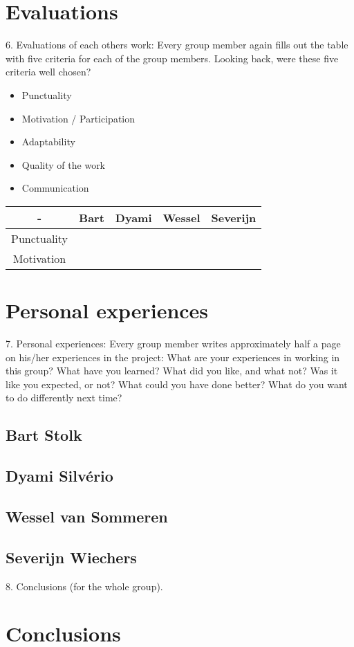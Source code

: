\documentclass{article}
\begin{document}
\section{Evaluations}
6. Evaluations of each others work: Every group member again fills out the table
with five criteria for each of the group members. Looking back, were these five
criteria well chosen?
    \begin{itemize}
       \item Punctuality
       \item Motivation / Participation
        \item Adaptability
        \item Quality of the work 
        \item Communication
    \end{itemize}

\begin{table}[]
    \centering
    \begin{tabular}{|c|c|c|c|c|}
        \hline
        - & Bart & Dyami & Wessel & Severijn \\
        \hline
        Punctuality & & & & \\
        \hline
        Motivation
    \end{tabular}
\end{table}

\section{Personal experiences}
7. Personal experiences: Every group member writes approximately half a page on
his/her experiences in the project: What are your experiences in working in this
group? What have you learned? What did you like, and what not? Was it like
you expected, or not? What could you have done better? What do you want to
do differently next time?
\subsection{Bart Stolk}


\subsection{Dyami Silvério}

\subsection{Wessel van Sommeren}

\subsection{Severijn Wiechers}

8. Conclusions (for the whole group).
\section{Conclusions}
\end{document}

